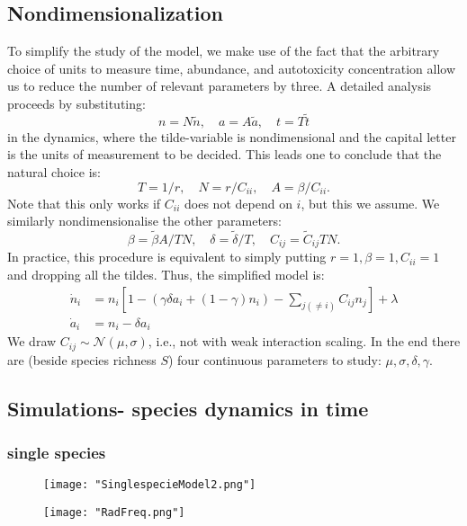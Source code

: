 \documentclass[11pt,a4paper,fleqn]{article}
\begin{document}
\subsection{Nondimensionalization}
To simplify the study of the model, we make use of the fact that the arbitrary choice of units to measure time, abundance, and autotoxicity concentration allow us to reduce the number of relevant parameters by three. A detailed analysis proceeds by substituting:
\begin{equation}
n = N\tilde{n}, \quad a = A\tilde{a}, \quad t= T\tilde{t}
\end{equation}
in the dynamics, where the tilde-variable is nondimensional and the capital letter is the units of measurement to be decided. This leads one to conclude that the natural choice is:
\begin{equation}
T = 1/r, \quad N= r/C_{ii}, \quad A=\beta/C_{ii}.
\end{equation}
Note that this only works if $C_{ii}$ does not depend on $i$, but this we assume. We similarly nondimensionalise the other parameters:
\begin{equation}
\beta = \tilde{\beta}A/TN, \quad \delta = \tilde{\delta}/T, \quad C_{ij} = \tilde{C}_{ij}TN.
\end{equation}
In practice, this procedure is equivalent to simply putting $r=1,\beta=1,C_{ii}=1$ and dropping all the tildes. Thus, the simplified model is:
\begin{align}
\label{eqnologspecies}
\dot{n}_i &= n_i\left[ 1 - \left(\gamma \delta a_i + (1-\gamma)n_i\right) - \sum_{j(\neq i)} C_{ij} n_j \right] + \lambda\\
\label{eqnologautotox}
\dot{a}_i &= n_i - \delta a_i
\end{align}
We draw $C_{ij}\sim \mathcal{N}(\mu,\sigma)$, i.e., not with weak interaction scaling. In the end there are (beside species richness $S$) four continuous parameters to study: $\mu,\sigma,\delta,\gamma$.
\subsection{Simulations- species dynamics in time}
\subsubsection{single species}
\begin{figure}[h]
    \centering
    \texttt{[image: "SinglespecieModel2.png"]} %
    \caption{\label{Simulations single species}}

\end{figure}
\begin{figure}[h]
    \centering
    \texttt{[image: "RadFreq.png"]} %
    \caption{\label{RadFreqModel2}}
    
\end{figure}
\end{document}
